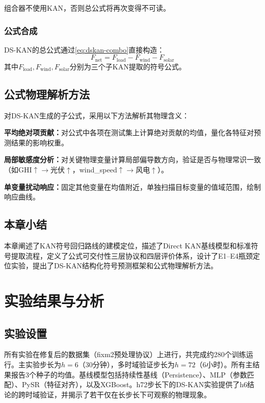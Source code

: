 \documentclass[12pt,a4paper,oneside]{ctexbook}
\begin{document}
组合器不使用KAN，否则总公式将再次变得不可读。

\subsection{公式合成}

DS-KAN的总公式通过\cref{eq:dskan-combo}直接构造：
\begin{equation}
F_{\text{net}} = F_{\text{load}} - F_{\text{wind}} - F_{\text{solar}}
\end{equation}
其中$F_{\text{load}}, F_{\text{wind}}, F_{\text{solar}}$分别为三个子KAN提取的符号公式。

\section{公式物理解析方法}

对DS-KAN生成的子公式，采用以下方法解析其物理含义：

\textbf{平均绝对项贡献：}对公式中各项在测试集上计算绝对贡献的均值，量化各特征对预测结果的影响权重。

\textbf{局部敏感度分析：}对关键物理变量计算局部偏导数方向，验证是否与物理常识一致（如GHI$\uparrow\to$光伏$\uparrow$，wind\_speed$\uparrow\to$风电$\uparrow$）。

\textbf{单变量扰动响应：}固定其他变量在均值附近，单独扫描目标变量的值域范围，绘制响应曲线。

\section{本章小结}

本章阐述了KAN符号回归路线的建模定位，描述了Direct KAN基线模型和标准符号提取流程，定义了公式可交付性三层协议和四层评价体系，设计了E1--E4瓶颈定位实验，提出了DS-KAN结构化符号预测框架和公式物理解析方法。


\chapter{实验结果与分析}

\section{实验设置}

所有实验在修复后的数据集（fixm2预处理协议）上进行，共完成约280个训练运行。主实验步长为$h=6$（30分钟），多时域验证步长为$h=72$（6小时）。所有主结果报告3个种子的均值。基线模型包括持续性基线（Persistence）、MLP（参数匹配）、PySR（特征对齐），以及XGBoost。h72步长下的DS-KAN实验提供了h6结论的跨时域验证，并揭示了若干仅在长步长下可观察的物理现象。
\end{document}
